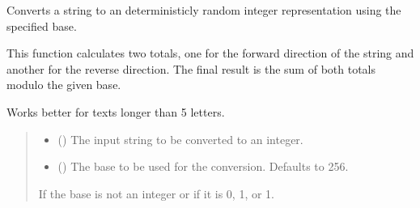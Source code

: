 \documentclass[letterpaper,10pt,english]{sphinxmanual}
\begin{document}

\begin{fulllineitems}
\label{\detokenize{generated/eflatun_uav.number_generators:eflatun_uav.number_generators.convert_string_to_int}}
\pysigstartsignatures
{}
\pysigstopsignatures
\sphinxAtStartPar
Converts a string to an deterministicly random integer representation using the specified base.

\sphinxAtStartPar
This function calculates two totals, one for the forward direction of the string
and another for the reverse direction. The final result is the sum of both totals
modulo the given base.

\sphinxAtStartPar
Works better for texts longer than 5 letters.
\begin{quote}\begin{description}
\begin{itemize}
\item {} 
\sphinxAtStartPar
{} () \textendash{} The input string to be converted to an integer.

\item {} 
\sphinxAtStartPar
{} (\sphinxstyleliteralemphasis{\sphinxupquote{{[}}}\sphinxstyleliteralemphasis{\sphinxupquote{{]}}}\sphinxstyleliteralemphasis{\sphinxupquote{, }}) \textendash{} The base to be used for the conversion. Defaults to 256.

\end{itemize}

\sphinxAtStartPar
{} \textendash{} If the base is not an integer or if it is 0, \sphinxhyphen{}1, or 1.


\end{description}
\end{quote}
\end{fulllineitems}
\end{document}
